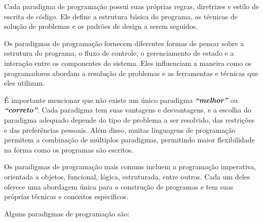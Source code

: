 \documentclass[a4paper, 12pt, onecolumn,singlespacing]{article}
\begin{document}
	Cada paradigma de programação possui suas próprias regras, diretrizes e estilo de escrita de código. Ele define a estrutura básica do programa, as técnicas de solução de problemas e os padrões de design a serem seguidos.
	
	Os paradigmas de programação fornecem diferentes formas de pensar sobre a estrutura do programa, o fluxo de controle, o gerenciamento de estado e a interação entre os componentes do sistema. Eles influenciam a maneira como os programadores abordam a resolução de problemas e as ferramentas e técnicas que eles utilizam.
	
	É importante mencionar que não existe um único paradigma \textbf{\textit{``melhor''}} ou \textbf{\textit{``correto''}}. Cada paradigma tem suas vantagens e desvantagens, e a escolha do paradigma adequado depende do tipo de problema a ser resolvido, das restrições e das preferências pessoais. Além disso, muitas linguagens de programação permitem a combinação de múltiplos paradigmas, permitindo maior flexibilidade na forma como os programas são escritos.
	
	Os paradigmas de programação mais comuns incluem a programação imperativa, orientada a objetos, funcional, lógica, estruturada, entre outros. Cada um deles oferece uma abordagem única para a construção de programas e tem suas próprias técnicas e conceitos específicos.
	
	Alguns paradigmas de programação são:
	
\end{document}
